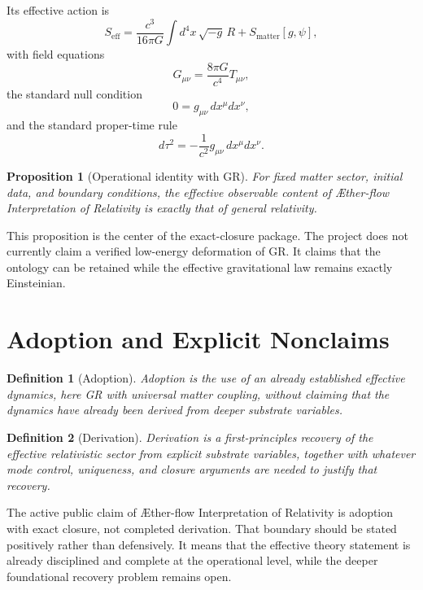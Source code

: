 \documentclass[11pt]{article}
\newcommand{\Aflow}{\AE{}ther-flow}
\newcommand{\TheoryName}{\Aflow{} Interpretation of Relativity}
\newtheorem{definition}{Definition}
\newtheorem{proposition}{Proposition}
\begin{document}
Its effective action is
\begin{equation}
S_{\mathrm{eff}}
=
\frac{c^3}{16\pi G}\int d^4x\,\sqrt{-g}\,R
+
S_{\mathrm{matter}}[g,\psi],
\label{eq:Seff}
\end{equation}
with field equations
\begin{equation}
G_{\mu\nu}
=
\frac{8\pi G}{c^4}T_{\mu\nu},
\label{eq:Einstein}
\end{equation}
the standard null condition
\begin{equation}
0=g_{\mu\nu}\,dx^\mu dx^\nu,
\label{eq:null}
\end{equation}
and the standard proper-time rule
\begin{equation}
d\tau^2=-\frac{1}{c^2}g_{\mu\nu}\,dx^\mu dx^\nu.
\label{eq:tau}
\end{equation}

\begin{proposition}[Operational identity with GR]
For fixed matter sector, initial data, and boundary conditions, the effective observable content of \TheoryName{} is exactly that of general relativity.
\end{proposition}

This proposition is the center of the exact-closure package. The project does not currently claim a verified low-energy deformation of GR. It claims that the ontology can be retained while the effective gravitational law remains exactly Einsteinian.

\section{Adoption and Explicit Nonclaims}

\begin{definition}[Adoption]
Adoption is the use of an already established effective dynamics, here GR with universal matter coupling, without claiming that the dynamics have already been derived from deeper substrate variables.
\end{definition}

\begin{definition}[Derivation]
Derivation is a first-principles recovery of the effective relativistic sector from explicit substrate variables, together with whatever mode control, uniqueness, and closure arguments are needed to justify that recovery.
\end{definition}

The active public claim of \TheoryName{} is adoption with exact closure, not completed derivation. That boundary should be stated positively rather than defensively. It means that the effective theory statement is already disciplined and complete at the operational level, while the deeper foundational recovery problem remains open.
\end{document}
